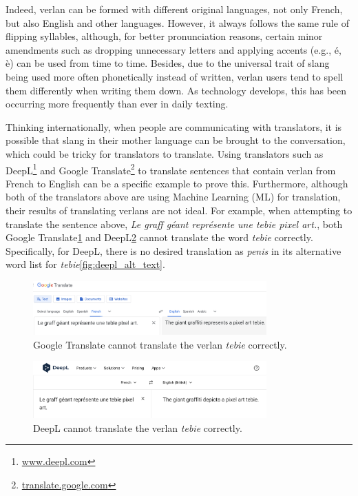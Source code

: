 \documentclass[12pt]{article}
\begin{document}
Indeed, verlan can be formed with different original languages, not only French, but also English and other languages. However, it always follows the same rule of flipping syllables, although, for better pronunciation reasons, certain minor amendments such as dropping unnecessary letters and applying accents (e.g., é, è) can be used from time to time\cite{rajabov2025}. Besides, due to the universal trait of slang being used more often phonetically instead of written, verlan users tend to spell them differently when writing them down. As technology develops, this has been occurring more frequently than ever in daily texting\cite{rua2005}.

Thinking internationally, when people are communicating with translators, it is possible that slang in their mother language can be brought to the conversation, which could be tricky for translators to translate\cite{hajiyeva2025}. Using translators such as DeepL\footnote{\url{www.deepl.com}} and Google Translate\footnote{\url{translate.google.com}} to translate sentences that contain verlan from French to English can be a specific example to prove this. Furthermore, although both of the translators above are using Machine Learning (ML) for translation, their results of translating verlans are not ideal\cite{deepl2020, wu2016}. For example, when attempting to translate the sentence above, \textit{Le graff géant représente une tebie pixel art.}, both Google Translate\ref{fig:google_verlan} and DeepL\ref{fig:deepl_verlan} cannot translate the word \textit{tebie} correctly. Specifically, for DeepL, there is no desired translation as \textit{penis} in its alternative word list for \textit{tebie}\ref{fig:deepl_alt_text}.

\begin{figure}[H]
\centering
\includegraphics[width=0.8\textwidth]{figures/google_verlan.png}
\caption{\label{fig:google_verlan}Google Translate cannot translate the verlan \textit{tebie} correctly.}
\end{figure}

\begin{figure}[H]
\centering
\includegraphics[width=0.8\textwidth]{figures/deepl_verlan.png}
\caption{\label{fig:deepl_verlan}DeepL cannot translate the verlan \textit{tebie} correctly.}
\end{figure}
\end{document}
